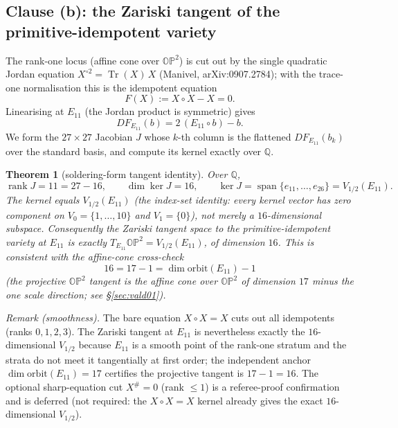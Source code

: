 \documentclass[11pt]{article}
\newcommand{\OP}{\mathbb{OP}^2}
\newcommand{\Eoneone}{E_{11}}
\newcommand{\Vhalf}{V_{1/2}}
\newcommand{\Tr}{\operatorname{Tr}}
\newcommand{\jord}{\circ}
\newtheorem{theorem}{Theorem}
\begin{document}
\subsection{Clause (b): the Zariski tangent of the primitive-idempotent variety}
The rank-one locus (affine cone over $\OP$) is cut out by the single quadratic
Jordan equation $X^{\jord 2}=\Tr(X)\,X$ (Manivel, arXiv:0907.2784); with the
trace-one normalisation this is the idempotent equation
\begin{equation}
F(X):=X\jord X-X=0 .
\end{equation}
Linearising at $\Eoneone$ (the Jordan product is symmetric) gives
\begin{equation}
DF_{\Eoneone}(b)=2\,(\Eoneone\jord b)-b .
\end{equation}
We form the $27\times 27$ Jacobian $J$ whose $k$-th column is the flattened
$DF_{\Eoneone}(b_k)$ over the standard basis, and compute its kernel exactly over
$\mathbb{Q}$.

\begin{theorem}[soldering-form tangent identity]
\label{thm:tangent}
Over $\mathbb{Q}$,
\begin{equation}
\operatorname{rank} J=11=27-16,
\qquad
\dim\ker J=16,
\qquad
\ker J=\operatorname{span}\{e_{11},\dots,e_{26}\}=\Vhalf(\Eoneone) .
\end{equation}
The kernel \emph{equals} $\Vhalf(\Eoneone)$ (the index-set identity: every kernel
vector has zero component on $V_0=\{1,\dots,10\}$ and $V_1=\{0\}$), not merely a
$16$-dimensional subspace. Consequently the Zariski tangent space to the
primitive-idempotent variety at $\Eoneone$ is exactly $T_{\Eoneone}\OP=
\Vhalf(\Eoneone)$, of dimension $16$. This is consistent with the affine-cone
cross-check
\begin{equation}
16=17-1=\dim\mathrm{orbit}(\Eoneone)-1
\end{equation}
(the projective $\OP$ tangent is the affine cone over $\OP$ of dimension
$17$ minus the one scale direction; see \S\ref{sec:vald01}).
\end{theorem}

\noindent\textit{Remark (smoothness).} The bare equation $X\jord X=X$ cuts out all
idempotents (ranks $0,1,2,3$). The Zariski tangent at $\Eoneone$ is nevertheless
exactly the $16$-dimensional $\Vhalf$ because $\Eoneone$ is a smooth point of the
rank-one stratum and the strata do not meet it tangentially at first order; the
independent anchor $\dim\mathrm{orbit}(\Eoneone)=17$ certifies the projective
tangent is $17-1=16$. The optional sharp-equation cut $X^{\#}=0$ (rank $\le 1$)
is a referee-proof confirmation and is deferred (not required: the $X\jord X=X$
kernel already gives the exact $16$-dimensional $\Vhalf$).
\end{document}
